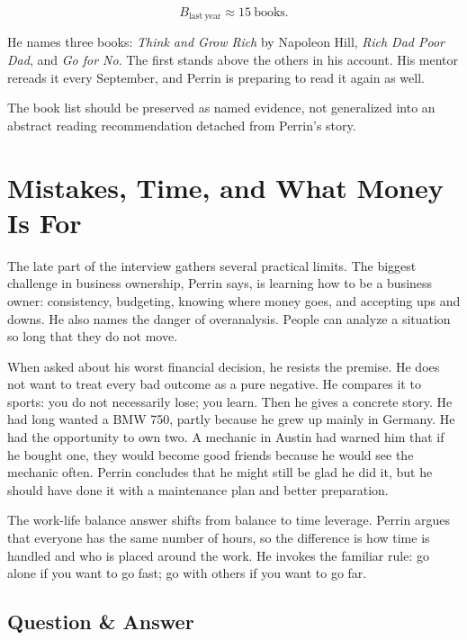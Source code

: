 \begin{equation}
B_{\mathrm{last\ year}}\approx 15\ \mathrm{books}.
\end{equation}

He names three books: \textit{Think and Grow Rich} by Napoleon Hill, \textit{Rich Dad Poor Dad}, and \textit{Go for No}. The first stands above the others in his account. His mentor rereads it every September, and Perrin is preparing to read it again as well.

\begin{remark}
The book list should be preserved as named evidence, not generalized into an abstract reading recommendation detached from Perrin's story.
\end{remark}

\section{Mistakes, Time, and What Money Is For}

The late part of the interview gathers several practical limits. The biggest challenge in business ownership, Perrin says, is learning how to be a business owner: consistency, budgeting, knowing where money goes, and accepting ups and downs. He also names the danger of overanalysis. People can analyze a situation so long that they do not move.

When asked about his worst financial decision, he resists the premise. He does not want to treat every bad outcome as a pure negative. He compares it to sports: you do not necessarily lose; you learn. Then he gives a concrete story. He had long wanted a BMW 750, partly because he grew up mainly in Germany. He had the opportunity to own two. A mechanic in Austin had warned him that if he bought one, they would become good friends because he would see the mechanic often. Perrin concludes that he might still be glad he did it, but he should have done it with a maintenance plan and better preparation.

The work-life balance answer shifts from balance to time leverage. Perrin argues that everyone has the same number of hours, so the difference is how time is handled and who is placed around the work. He invokes the familiar rule: go alone if you want to go fast; go with others if you want to go far.

\subsection{Question \& Answer}

